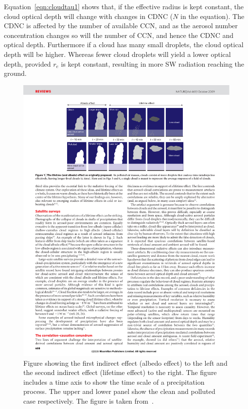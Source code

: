 Equation~\ref{eqn:cloudtau1} shows that, if the effective radius is kept constant, the cloud optical depth will change with changes in CDNC ($N$ in the equation). The CDNC is affected by the number of available CCN, and as the aerosol number concentration changes so will the number of CCN, and hence the CDNC and optical depth. Furthermore if a cloud has many small droplets, the cloud optical depth will be higher. Whereas fewer cloud droplets will yield a lower optical depth, provided $r_e$ is kept constant, resulting in more SW radiation reaching the ground.

\begin{figure}
\centering
\includegraphics[width=1.1\textwidth]{theory/indirecteffects.pdf}
\caption{Figure showing the first indirect effect (albedo effect) to the left and the second indirect effect (lifetime effect) to the right. The figure includes a time axis to show the time scale of a precipitation process. The upper and lower panel show the clean and polluted case respectively. The figure is taken from~\cite{Stevens2009}.}
\label{fig:indirecteffects}
\end{figure}

